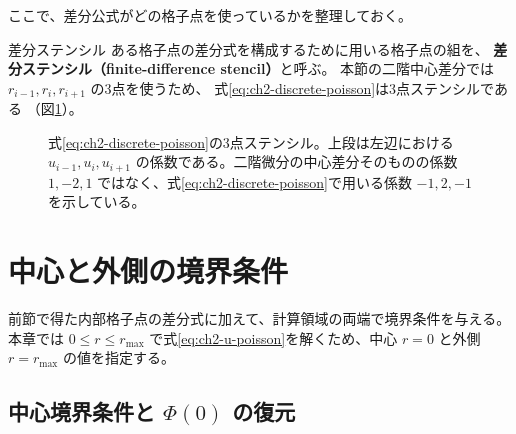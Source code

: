 ここで、差分公式がどの格子点を使っているかを整理しておく。

\begin{definitionbox}{差分ステンシル}
ある格子点の差分式を構成するために用いる格子点の組を、
\textbf{差分ステンシル（finite-difference stencil）}と呼ぶ。
本節の二階中心差分では $r_{i-1},r_i,r_{i+1}$ の3点を使うため、
式\eqref{eq:ch2-discrete-poisson}は3点ステンシルである
（図\ref{fig:ch2-stencil}）。
\end{definitionbox}

\begin{figure}[!htbp]
\centering
{}
\caption{式\eqref{eq:ch2-discrete-poisson}の3点ステンシル。上段は左辺における $u_{i-1},u_i,u_{i+1}$ の係数である。二階微分の中心差分そのものの係数 $1,-2,1$ ではなく、式\eqref{eq:ch2-discrete-poisson}で用いる係数 $-1,2,-1$ を示している。}
\label{fig:ch2-stencil}
\end{figure}


\section{中心と外側の境界条件}
\label{sec:ch2-boundaries}

前節で得た内部格子点の差分式に加えて、計算領域の両端で境界条件を与える。
本章では $0\le r\le r_{\max}$ で式\eqref{eq:ch2-u-poisson}を解くため、中心 $r=0$ と外側 $r=r_{\max}$ の値を指定する。

\subsection{中心境界条件と $\Phi(0)$ の復元}

